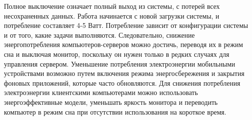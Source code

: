 Полное выключение означает полный выход из системы, с потерей всех несохраненных данных. Работа начинается с новой загрузки системы, и потребление составляет 4-5 Ватт.
Потребление зависит от конфигурации системы и от того, какие задачи выполняются.
Следовательно, снижение энергопотребления компьютеров-серверов можно достичь, переводя их в режим сна и выключая монитор, поскольку он нужен только в редких случаях для управления сервером. Уменьшение потребления электроэнергии мобильными устройствами возможно путем включения режима энергосбережения и закрытия фоновых приложений, которые часто обновляются.
Для снижения потребления электроэнергии клиентскими компьютерами можно использовать энергоэффективные модели, уменьшать яркость монитора и переводить компьютер в режим сна при отсутствии использования на короткое время.
